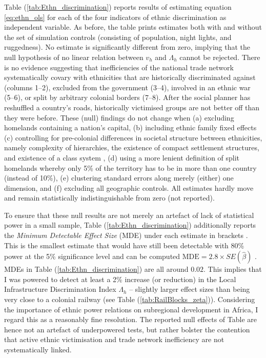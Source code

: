 \documentclass[11pt, oneside]{article}   	%
\let\oldref\ref
\renewcommand{\ref}[1]{(\oldref{#1})}
\begin{document}
Table \ref{tab:Ethn_discrimination} reports results of estimating equation \eqref{eq:ethn_ols} for each of the four indicators of ethnic discrimination as independent variable. As before, the table prints estimates both with and without the set of simulation controls (consisting of population, night lights, and ruggedness). No estimate is significantly different from zero, implying that the null hypothesis of no linear relation between $v_{h}$ and $\Lambda_{h}$ cannot be rejected. There is no evidence suggesting that inefficiencies of the national trade network systematically covary with ethnicities that are historically discriminated against (columns 1--2), excluded from the government (3--4), involved in an ethnic war (5--6), or split by arbitrary colonial borders (7--8). After the social planner has reshuffled a country's roads, historically victimised groups are not better off than they were before. These (null) findings do not change when (a) excluding homelands containing a nation's capital, (b) including ethnic family fixed effects (c) controlling for pre-colonial differences in societal structure between ethnicities, namely complexity of hierarchies, the existence of compact settlement structures, and existence of a class system \citep{Michalopoulos_PreColonialEthnicInstitutions_2013}, (d) using a more lenient definition of split homelands whereby only 5\% of the territory has to be in more than one country (instead of 10\%), (e) clustering standard errors along merely (either) one dimension, and (f) excluding all geographic controls. All estimates hardly move and remain statistically indistinguishable from zero (not reported).

To ensure that these null results are not merely an artefact of lack of statistical power in a small sample, Table \ref{tab:Ethn_discrimination} additionally reports the \emph{Minimum Detectable Effect Size} (MDE) under each estimate in brackets \citep{Haushofer_ShorttermImpactUnconditional_2016}. This is the smallest estimate that would have still been detectable with 80\% power at the 5\% significance level and can be computed $\textrm{MDE} = 2.8 \times SE(\hat{\beta})$ \citep[see ][]{Haushofer_ShorttermImpactUnconditional_2016}. MDEs in Table \ref{tab:Ethn_discrimination} are all around $0.02$. This implies that I was powered to detect at least a 2\% increase (or reduction) in the Local Infrastructure Discrimination Index $\Lambda_{h}$ -- slightly larger effect sizes than being very close to a colonial railway (see Table \ref{tab:RailBlocks_zeta}). Considering the importance of ethnic power relations on subregional development in Africa, I regard this as a reasonably fine resolution. The reported null effects of Table are hence not an artefact of underpowered tests, but rather bolster the contention that active ethnic victimisation and trade network inefficiency are not systematically linked.
\end{document}
